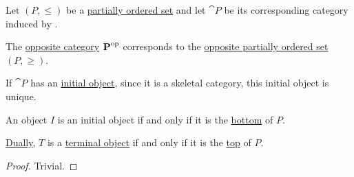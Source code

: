 \begin{proposition}\label{thm:order_category_isomorphism_properties}
  Let \( (P, \leq) \) be a \hyperref[def:partially_ordered_set]{partially ordered set} and let \( \cat{P} \) be its corresponding category induced by .

  \begin{thmenum}
     The \hyperref[def:opposite_category]{opposite category} \( \operatorname{\mathbf{P}}^{\operatorname{op}} \) corresponds to the \hyperref[def:partially_ordered_set/duality]{opposite partially ordered set} \( (P, \geq) \).

     If \( \cat{P} \) has an \hyperref[def:universal_objects/initial]{initial object}, since it is a skeletal category, this initial object is unique.

    An object \( I \) is an initial object if and only if it is the \hyperref[def:partially_ordered_set_extremal_points/top_and_bottom]{bottom} of \( P \).

    \hyperref[thm:categorical_principle_of_duality]{Dually}, \( T \) is a \hyperref[def:universal_objects/terminal]{terminal object} if and only if it is the \hyperref[def:partially_ordered_set_extremal_points/top_and_bottom]{top} of \( P \).
  \end{thmenum}
\end{proposition}
\begin{proof}
  Trivial.
\end{proof}
